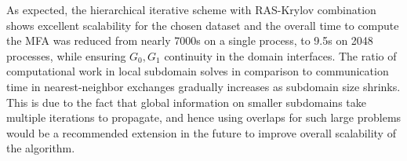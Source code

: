 As expected, the hierarchical iterative scheme with RAS-Krylov combination shows excellent scalability for the chosen dataset and the overall time to compute the MFA was reduced from nearly 7000s on a single process,  to 9.5s on 2048 processes, while ensuring $G_0, G_1$ continuity in the domain interfaces. The ratio of computational work in local subdomain solves in comparison to communication time in nearest-neighbor exchanges gradually increases as subdomain size shrinks. This is due to the fact that global information on smaller subdomains take multiple iterations to propagate, and hence using overlaps for such large problems would be a recommended extension in the future to improve overall scalability of the algorithm.




